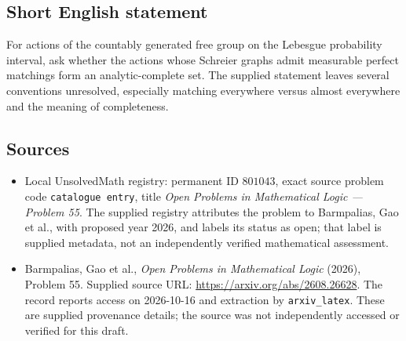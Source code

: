 \documentclass[11pt]{article}
\begin{document}
\subsection{Short English statement}
For actions of the countably generated free group on the Lebesgue probability interval, ask whether the actions whose Schreier graphs admit measurable perfect matchings form an analytic-complete set. The supplied statement leaves several conventions unresolved, especially matching everywhere versus almost everywhere and the meaning of completeness.
\subsection{Sources}
\begin{itemize}
\item Local UnsolvedMath registry: permanent ID \(801043\), exact source problem code \texttt{catalogue entry}, title \emph{Open Problems in Mathematical Logic --- Problem 55}. The supplied registry attributes the problem to Barmpalias, Gao et al., with proposed year 2026, and labels its status as open; that label is supplied metadata, not an independently verified mathematical assessment.
\item Barmpalias, Gao et al., \emph{Open Problems in Mathematical Logic} (2026), Problem 55. Supplied source URL: \url{https://arxiv.org/abs/2608.26628}. The record reports access on 2026-10-16 and extraction by \texttt{arxiv\_latex}. These are supplied provenance details; the source was not independently accessed or verified for this draft.
\end{itemize}
\end{document}
